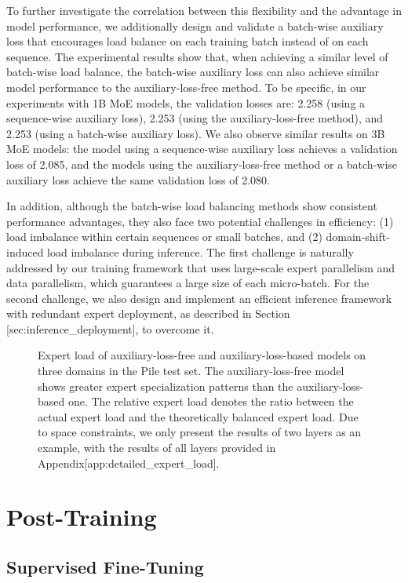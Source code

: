 \documentclass[11pt,a4paper]{article}
\begin{document}
To further investigate the correlation between this flexibility and the advantage in model performance, we additionally design and validate a batch-wise auxiliary loss that encourages load balance on each training batch instead of on each sequence. The experimental results show that, when achieving a similar level of batch-wise load balance, the batch-wise auxiliary loss can also achieve similar model performance to the auxiliary-loss-free method. To be specific, in our experiments with 1B MoE models, the validation losses are: 2.258 (using a sequence-wise auxiliary loss), 2.253 (using the auxiliary-loss-free method), and 2.253 (using a batch-wise auxiliary loss). We also observe similar results on 3B MoE models: the model using a sequence-wise auxiliary loss achieves a validation loss of 2.085, and the models using the auxiliary-loss-free method or a batch-wise auxiliary loss achieve the same validation loss of 2.080.

In addition, although the batch-wise load balancing methods show consistent performance advantages, they also face two potential challenges in efficiency: (1) load imbalance within certain sequences or small batches, and (2) domain-shift-induced load imbalance during inference. The first challenge is naturally addressed by our training framework that uses large-scale expert parallelism and data parallelism, which guarantees a large size of each micro-batch. For the second challenge, we also design and implement an efficient inference framework with redundant expert deployment, as described in Section [sec:inference\_deployment], to overcome it.

\begin{figure}[h]
\caption{Expert load of auxiliary-loss-free and auxiliary-loss-based models on three domains in the Pile test set. The auxiliary-loss-free model shows greater expert specialization patterns than the auxiliary-loss-based one. The relative expert load denotes the ratio between the actual expert load and the theoretically balanced expert load. Due to space constraints, we only present the results of two layers as an example, with the results of all layers provided in Appendix[app:detailed\_expert\_load].}
\end{figure}

\section{Post-Training}

\subsection{Supervised Fine-Tuning}
\end{document}
